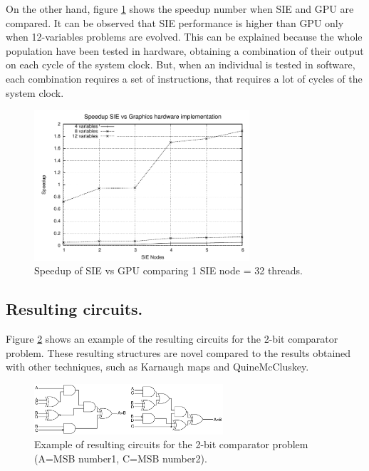 \documentclass[runningheads,a4paper]{llncs}
\begin{document}
On the other hand, figure \ref{fig:speedup2} shows the speedup number when SIE and GPU are compared. It can be observed that SIE performance is higher than GPU only when 12-variables problems are evolved.  This can be explained because the whole population have been tested in hardware, obtaining a combination of their output on each cycle of the system clock. But, when an individual is tested in software, each combination requires a set of instructions, that requires a lot of cycles of the system clock.

\begin{figure}[h!]
\begin{center} 
\includegraphics[width=8cm]{./images/speedup_sie_vs_cuda} 
\end{center}
\caption{Speedup of SIE vs GPU comparing 1 SIE node = 32 threads.}
\label{fig:speedup2}
\end{figure}

\subsection{Resulting circuits.}
Figure \ref{fig:result-circuit} shows an example of the resulting circuits for the 2-bit comparator problem. These resulting structures are novel compared to the results obtained with other techniques, such as Karnaugh maps and QuineMcCluskey.

\begin{figure}[h!]
\centering
\includegraphics[width=7cm]{./images/result-circuit}
\caption{Example of resulting circuits for the 2-bit comparator problem (A=MSB number1, C=MSB number2).}
\label{fig:result-circuit}
\end{figure}


\end{document}
